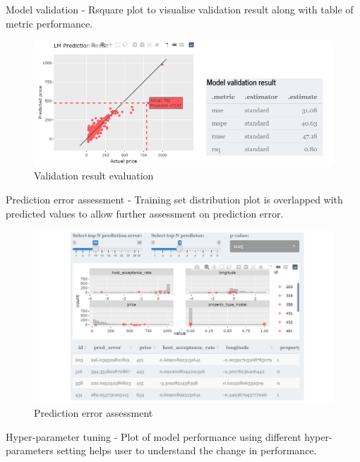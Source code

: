 \documentclass{acm_proc_article-sp}
\begin{document}
Model validation - Rsquare plot to visualise validation result along
with table of metric performance.

\begin{figure}[H]

{\centering \includegraphics[width=1\linewidth]{images/mdleval} 

}

\caption{Validation result evaluation}\label{fig:unnamed-chunk-9}
\end{figure}

Prediction error assessment - Training set distribution plot is
overlapped with predicted values to allow further assessment on
prediction error.

\begin{figure}[H]

{\centering \includegraphics[width=1\linewidth]{images/prederror} 

}

\caption{Prediction error assessment}\label{fig:unnamed-chunk-10}
\end{figure}

Hyper-parameter tuning - Plot of model performance using different
hyper-parameters setting helps user to understand the change in
performance.
\end{document}
